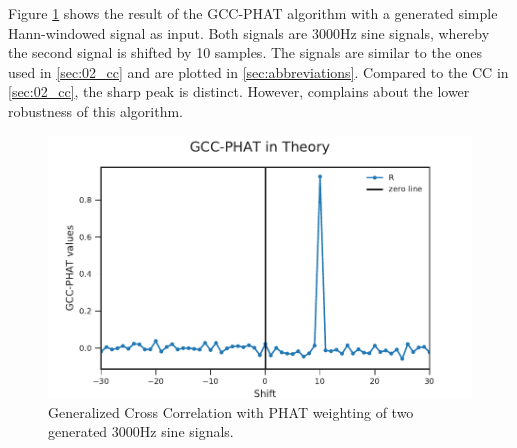 Figure \cref{fig:03_gccTheory} shows the result of the \ac{GCC-PHAT} algorithm with a generated
simple Hann-windowed signal as input. Both signals are 3000\si{Hz} sine signals, whereby
the second signal is shifted by 10 samples.
The signals are similar to the ones used in \cref{sec:02_cc}
and are plotted in \cref{sec:abbreviations}.
Compared to the \ac{CC} in \cref{sec:02_cc}, the sharp peak is distinct.
However, \cite{K_C_GCC} complains about the lower robustness of this algorithm.
\begin{figure}[ht]
	\centering
		\includegraphics[width=1\columnwidth]{figures/GCC_theory}
	\caption{Generalized Cross Correlation with PHAT weighting of two generated 3000Hz sine signals.}
    \label{fig:03_gccTheory}
\end{figure}

